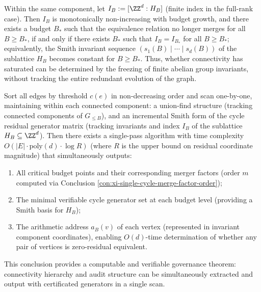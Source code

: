 \begin{conclusion}\label{con:xi-smith-invariants-freeze-stabilization}
Within the same component, let \(I_B:=[\ZZ^d:H_B]\) (finite index in the full-rank case).
Then \(I_B\) is monotonically non-increasing with budget growth, and there exists a budget \(B_\ast\) such that the equivalence relation no longer merges for all \(B\ge B_\ast\), if and only if there exists \(B_\ast\) such that \(I_B=I_{B_\ast}\) for all \(B\ge B_\ast\);
equivalently, the Smith invariant sequence \((s_1(B)\mid\cdots\mid s_d(B))\) of the sublattice \(H_B\) becomes constant for \(B\ge B_\ast\).
Thus, whether connectivity has saturated can be determined by the freezing of finite abelian group invariants, without tracking the entire redundant evolution of the graph.
\end{conclusion}

\begin{conclusion}\label{con:xi-one-pass-governance-algorithm}
Sort all edges by threshold \(c(e)\) in non-decreasing order and scan one-by-one, maintaining within each connected component:
a union-find structure (tracking connected components of \(G_{\le B}\)), and an incremental Smith form of the cycle residual generator matrix (tracking invariants and index \(I_B\) of the sublattice \(H_B\subseteq\ZZ^d\)).
Then there exists a single-pass algorithm with time complexity
\(
O(|E|\cdot \mathrm{poly}(d)\cdot \log R)
\)
(where \(R\) is the upper bound on residual coordinate magnitude) that simultaneously outputs:
\begin{enumerate}
  \item All critical budget points and their corresponding merger factors (order \(m\) computed via Conclusion \ref{con:xi-single-cycle-merge-factor-order});
  \item The minimal verifiable cycle generator set at each budget level (providing a Smith basis for \(H_B\));
  \item The arithmetic address \(a_B(v)\) of each vertex (represented in invariant component coordinates), enabling \(O(d)\)-time determination of whether any pair of vertices is zero-residual equivalent.
\end{enumerate}
This conclusion provides a computable and verifiable governance theorem: connectivity hierarchy and audit structure can be simultaneously extracted and output with certificated generators in a single scan.
\end{conclusion}

